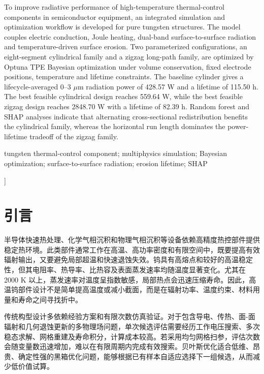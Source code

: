 \documentclass[10pt,twocolumn]{ctexart}
\begin{document}
\begin{@twocolumnfalse}
 To improve radiative performance of high-temperature thermal-control components in semiconductor equipment, an integrated simulation and optimization workflow is developed for pure tungsten structures. The model couples electric conduction, Joule heating, dual-band surface-to-surface radiation and temperature-driven surface erosion. Two parameterized configurations, an eight-segment cylindrical family and a zigzag long-path family, are optimized by Optuna TPE Bayesian optimization under volume conservation, fixed electrode positions, temperature and lifetime constraints. The baseline cylinder gives a lifecycle-averaged 0--3 $\mu$m radiation power of 428.57 W and a lifetime of 115.50 h. The best feasible cylindrical design reaches 559.64 W, while the best feasible zigzag design reaches 2848.70 W with a lifetime of 82.39 h. Random forest and SHAP analyses indicate that alternating cross-sectional redistribution benefits the cylindrical family, whereas the horizontal run length dominates the power-lifetime tradeoff of the zigzag family.

\vspace{1mm}
 tungsten thermal-control component; multiphysics simulation; Bayesian optimization; surface-to-surface radiation; erosion lifetime; SHAP

\vspace{1mm}
\vspace{4mm}
\end{@twocolumnfalse}
]

\section{引言}
半导体快速热处理、化学气相沉积和物理气相沉积等设备依赖高精度热控部件提供稳定热环境。此类部件通常工作在高温、高功率密度和有限空间中，既要提高有效辐射输出，又要避免局部超温和快速退蚀失效。钨具有高熔点和较好的高温稳定性，但其电阻率、热导率、比热容及表面蒸发速率均随温度显著变化。尤其在 2000 K 以上，蒸发速率对温度呈指数敏感，局部热点会迅速压缩寿命。因此，高温钨部件设计不是简单提高温度或减小截面，而是在辐射功率、温度约束、材料用量和寿命之间寻找折中。

传统构型设计多依赖经验方案和有限次数仿真验证。对于包含导电、传热、面-面辐射和几何退蚀更新的多物理场问题，单次候选评估需要经历工作电压搜索、多次稳态求解、网格重建及寿命积分，计算成本较高。若采用均匀网格扫参，评估次数会随变量数迅速增加，难以在有限周期内完成有效搜索。贝叶斯优化适合低维、昂贵、确定性强的黑箱优化问题，能够根据已有样本自适应选择下一组候选，从而减少低价值试算。
\end{document}

